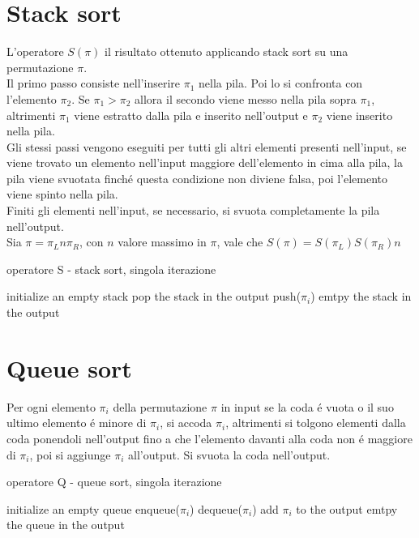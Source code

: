 \section*{Stack sort}
L'operatore $S(\pi)$ il risultato ottenuto applicando stack sort su una permutazione $\pi$.\\
Il primo passo consiste nell'inserire $\pi_1$ nella pila. Poi lo si confronta con l'elemento $\pi_2$. Se $\pi_1>\pi_2$ allora il secondo viene messo nella pila sopra $\pi_1$, altrimenti $\pi_1$ viene estratto dalla pila e inserito nell'output e $\pi_2$ viene inserito nella pila.\\
Gli stessi passi vengono eseguiti per tutti gli altri elementi presenti nell'input, se viene trovato un elemento nell'input maggiore dell'elemento in cima alla pila, la pila viene svuotata finch\'e questa condizione non diviene falsa, poi l'elemento viene spinto nella pila.\\
Finiti gli elementi nell'input, se necessario, si svuota completamente la pila nell'output.\\
Sia $\pi = \pi_Ln\pi_R$, con $n$ valore massimo in $\pi$, vale che $S(\pi)=S(\pi_L)S(\pi_R)n$
\begin{algorithm}[H]
   \caption{operatore S - stack sort, singola iterazione}
\begin{algorithmic}
\State initialize an empty stack
   \State pop the stack in the output
   \EndWhile
   \State push($\pi_i$)
   \EndFor
   \State emtpy the stack in the output
\end{algorithmic}
\end{algorithm}
\section*{Queue sort}
Per ogni elemento $\pi_i$ della permutazione $\pi$ in input se la coda \'e vuota o il suo ultimo elemento \'e minore di $\pi_i$, si accoda $\pi_i$, altrimenti si tolgono elementi dalla coda ponendoli nell'output fino a che l'elemento davanti  alla coda non \'e maggiore di $\pi_i$, poi si aggiunge $\pi_i$ all'output.
Si svuota la coda nell'output. 
\begin{algorithm}[H]
   \caption{operatore Q - queue sort, singola iterazione}
\begin{algorithmic}
\State initialize an empty queue
\State enqueue($\pi_i$)
\Else
{}
\State dequeue($\pi_i$)
\EndWhile
\State add $\pi_i$ to the output
\EndIf
\EndFor
\State emtpy the queue in the output
\end{algorithmic}
\end{algorithm}
